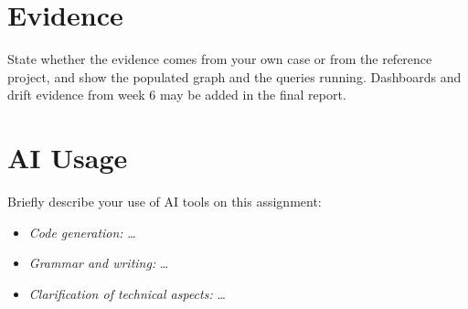 \documentclass[report]{itvest}
\begin{document}
\section{Evidence}

State whether the evidence comes from your own case or from the reference
project, and show the populated graph and the queries running. Dashboards
and drift evidence from week 6 may be added in the final report.

\section{AI Usage}

Briefly describe your use of AI tools on this assignment:

\begin{itemize}
  \item \emph{Code generation:} \ldots
  \item \emph{Grammar and writing:} \ldots
  \item \emph{Clarification of technical aspects:} \ldots
\end{itemize}



\end{document}
